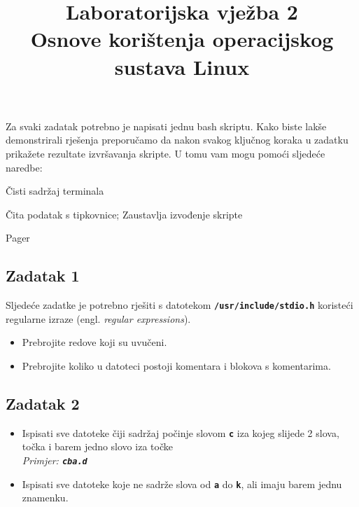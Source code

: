 \documentclass[12pt,a4paper]{article}
\newcommand{\shell}[1]{\texttt{\textbf{#1}}}
\begin{document}
	\title{Laboratorijska vježba 2\\{\small Osnove korištenja operacijskog sustava Linux}\vspace{-2em}}
	\maketitle
	Za svaki zadatak potrebno je napisati jednu bash skriptu. Kako biste lakše demonstrirali rješenja preporučamo da nakon svakog ključnog koraka u zadatku prikažete rezultate izvršavanja skripte. U tomu vam mogu pomoći sljedeće naredbe:
	\begin{description}[leftmargin=!,labelwidth=4em,itemsep=0em]
		\item[\shell{clear}] Čisti sadržaj terminala
		\item[\shell{read -p}] Čita podatak s tipkovnice; Zaustavlja izvođenje skripte
		\item[\shell{less}] Pager
	\end{description}
	
	\subsection*{Zadatak 1}
	Sljedeće zadatke je potrebno rješiti s datotekom \shell{/usr/include/stdio.h} koristeći regularne izraze (engl. \textit{regular expressions}).
	\begin{itemize}
		\item Prebrojite redove koji su uvučeni.
		\item Prebrojite koliko u datoteci postoji komentara i blokova s komentarima.
	\end{itemize}
	
	\subsection*{Zadatak 2}
	\begin{itemize}
		\item Ispisati sve datoteke čiji sadržaj počinje slovom \shell{c} iza kojeg slijede 2 slova, točka i barem jedno slovo iza točke \\ \textit{Primjer: \shell{cba.d} }
		\item Ispisati sve datoteke koje ne sadrže slova od \shell{a} do \shell{k}, ali imaju barem jednu znamenku.
	\end{itemize}
	
\end{document}
